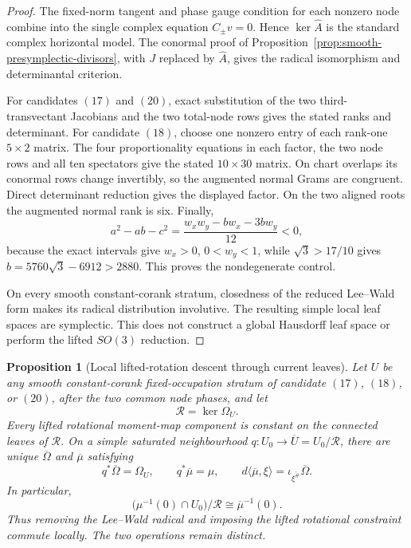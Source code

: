 \documentclass[11pt]{article}
\newtheorem{proposition}[theorem]{Proposition}
\theoremstyle{definition}
\theoremstyle{remark}
\begin{document}
\begin{proof}
The fixed-norm tangent and phase gauge condition for each nonzero node combine
into the single complex equation \(C_\pm v=0\).  Hence
\(\ker\widehat A\) is the standard complex horizontal model.  The conormal
proof of Proposition~\ref{prop:smooth-presymplectic-divisors}, with \(J\)
replaced by \(\widehat A\), gives the radical isomorphism and determinantal
criterion.

For candidates \((17)\) and \((20)\), exact substitution of the two
third-transvectant Jacobians and the two total-node rows gives the stated
ranks and determinant.  For candidate \((18)\), choose one nonzero entry of
each rank-one \(5\times2\) matrix.  The four proportionality equations in
each factor, the two node rows and all ten spectators give the stated
\(10\times30\) matrix.  On chart overlaps its conormal rows change
invertibly, so the augmented normal Grams are congruent.  Direct determinant
reduction gives the displayed factor.  On the two aligned roots the
augmented normal rank is six.  Finally,
\[
 a^2-ab-c^2=\frac{w_xw_y-bw_x-3bw_y}{12}<0,
\]
because the exact intervals give \(w_x>0\), \(0<w_y<1\), while
\(\sqrt3>17/10\) gives \(b=5760\sqrt3-6912>2880\).  This proves the
nondegenerate control.

On every smooth constant-corank stratum, closedness of the reduced
Lee--Wald form makes its radical distribution involutive.  The resulting
simple local leaf spaces are symplectic.  This does not construct a global
Hausdorff leaf space or perform the lifted \(SO(3)\) reduction.
\end{proof}

\begin{proposition}[Local lifted-rotation descent through current leaves]
\label{prop:local-rotation-leaf-descent}
Let \(U\) be any smooth constant-corank fixed-occupation stratum of
candidate \((17)\), \((18)\), or \((20)\), after the two common node phases,
and let
\[
 \mathcal R=\ker\Omega_U .
\]
Every lifted rotational moment-map component is constant on the connected
leaves of \(\mathcal R\).  On a simple saturated neighbourhood
\(q:U_0\to\overline U=U_0/\mathcal R\), there are unique
\(\overline\Omega\) and \(\overline\mu\) satisfying
\[
 q^*\overline\Omega=\Omega_U,\qquad q^*\overline\mu=\mu,
 \qquad
 d\langle\overline\mu,\xi\rangle
 =\iota_{\overline{\xi^\#}}\overline\Omega .
\]
In particular,
\[
 \bigl(\mu^{-1}(0)\cap U_0\bigr)/\mathcal R
 \cong \overline\mu^{-1}(0).
\]
Thus removing the Lee--Wald radical and imposing the lifted rotational
constraint commute locally.  The two operations remain distinct.
\end{proposition}
\end{document}
